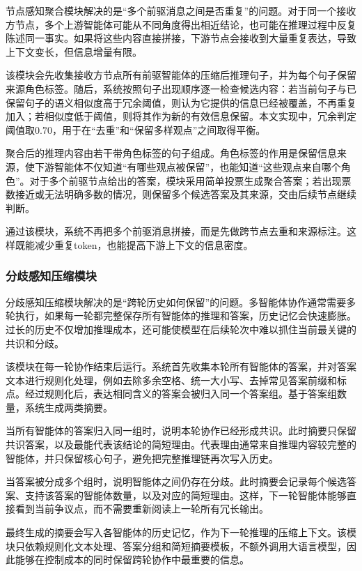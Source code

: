 \documentclass[11pt, a4paper]{article}
\numberwithin{figure}{section}
\begin{document}
节点感知聚合模块解决的是“多个前驱消息之间是否重复”的问题。对于同一个接收方节点，多个上游智能体可能从不同角度得出相近结论，也可能在推理过程中反复陈述同一事实。如果将这些内容直接拼接，下游节点会接收到大量重复表达，导致上下文变长，但信息增量有限。

该模块会先收集接收方节点所有前驱智能体的压缩后推理句子，并为每个句子保留来源角色标签。随后，系统按照句子出现顺序逐一检查候选内容：若当前句子与已保留句子的语义相似度高于冗余阈值，则认为它提供的信息已经被覆盖，不再重复加入；若相似度低于阈值，则将其作为新的有效信息保留。本文实现中，冗余判定阈值取$0.70$，用于在“去重”和“保留多样观点”之间取得平衡。

聚合后的推理内容由若干带角色标签的句子组成。角色标签的作用是保留信息来源，使下游智能体不仅知道“有哪些观点被保留”，也能知道“这些观点来自哪个角色”。对于多个前驱节点给出的答案，模块采用简单投票生成聚合答案；若出现票数接近或无法明确多数的情况，则保留多个候选答案及其来源，交由后续节点继续判断。

通过该模块，系统不再把多个前驱消息拼接，而是先做跨节点去重和来源标注。这样既能减少重复token，也能提高下游上下文的信息密度。

\subsubsection{分歧感知压缩模块}

分歧感知压缩模块解决的是“跨轮历史如何保留”的问题。多智能体协作通常需要多轮执行，如果每一轮都完整保存所有智能体的推理和答案，历史记忆会快速膨胀。过长的历史不仅增加推理成本，还可能使模型在后续轮次中难以抓住当前最关键的共识和分歧。

该模块在每一轮协作结束后运行。系统首先收集本轮所有智能体的答案，并对答案文本进行规则化处理，例如去除多余空格、统一大小写、去掉常见答案前缀和标点。经过规则化后，表达相同含义的答案会被归入同一个答案组。基于答案组数量，系统生成两类摘要。

当所有智能体的答案归入同一组时，说明本轮协作已经形成共识。此时摘要只保留共识答案，以及最能代表该结论的简短理由。代表理由通常来自推理内容较完整的智能体，并只保留核心句子，避免把完整推理链再次写入历史。

当答案被分成多个组时，说明智能体之间仍存在分歧。此时摘要会记录每个候选答案、支持该答案的智能体数量，以及对应的简短理由。这样，下一轮智能体能够直接看到当前争议点，而不需要重新阅读上一轮所有冗长输出。

最终生成的摘要会写入各智能体的历史记忆，作为下一轮推理的压缩上下文。该模块只依赖规则化文本处理、答案分组和简短摘要模板，不额外调用大语言模型，因此能够在控制成本的同时保留跨轮协作中最重要的信息。
\end{document}

